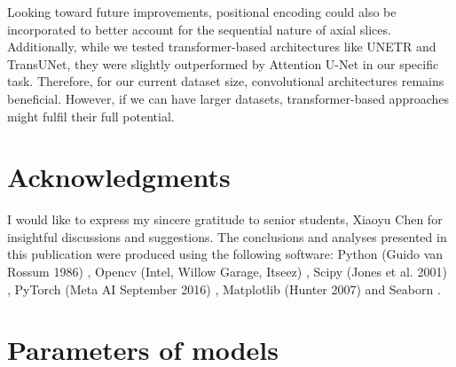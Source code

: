 \documentclass[12pt]{iopart}
\begin{document}
Looking toward future improvements, positional encoding could also be incorporated to better account for the sequential nature of axial slices. Additionally, while we tested transformer-based architectures like UNETR and TransUNet, they were slightly outperformed by Attention U-Net in our specific task. 
Therefore, for our current dataset size, convolutional architectures remains beneficial. However, if we can have larger datasets, transformer-based approaches might fulfil their full potential.




\section{Acknowledgments}
I would like to express my sincere gratitude to senior students, Xiaoyu Chen for insightful discussions and suggestions.
The conclusions and analyses presented in this publication were produced using the following software: Python (Guido van Rossum 1986) \cite{10.5555/1593511}, Opencv (Intel, Willow Garage, Itseez) \cite{itseez2015opencv}, Scipy (Jones et al. 2001) \cite{2020SciPy-NMeth}, PyTorch  (Meta AI September 2016) \cite{NEURIPS2019_9015}, Matplotlib (Hunter 2007) \cite{Hunter:2007} and Seaborn \cite{Waskom2021}.

\appendix

\section{Parameters of models}
\label{sec:appendix}
\end{document}
